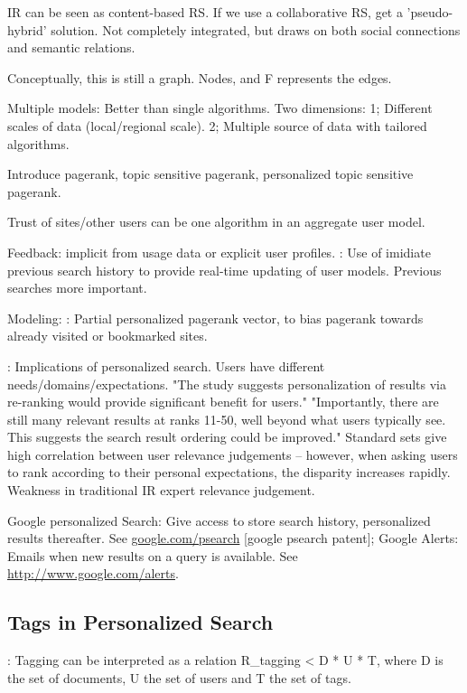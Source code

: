 IR can be seen as content-based RS. 
If we use a collaborative RS, get a 'pseudo-hybrid' solution. Not completely integrated,
but draws on both social connections and semantic relations.

Conceptually, this is still a graph.
Nodes, and F represents the edges.

Multiple models: Better than single algorithms. Two dimensions: 
1; Different scales of data (local/regional scale).
2; Multiple source of data with tailored algorithms.

Introduce pagerank, topic sensitive pagerank, personalized topic sensitive pagerank.

Trust of sites/other users can be one algorithm in an aggregate user model.

Feedback: 
\cite[p9]{Micarelli2007} implicit from usage data or explicit user profiles. 
\cite{Shen2005}: Use of imidiate previous search history to provide real-time updating of user models. Previous searches more important.

Modeling:
\cite{Jeh2003}: Partial personalized pagerank vector, to bias pagerank towards already visited or bookmarked sites.

\cite[p2]{Teevan2005a}: Implications of personalized search. Users have different needs/domains/expectations.
"The study suggests personalization of results via re-ranking would provide significant benefit for users."
"Importantly, there are still many relevant results at ranks 11-50, well beyond what users typically see. 
This suggests the search result ordering could be improved."
Standard sets give high correlation between user relevance judgements -- however, when asking users
to rank according to their personal expectations, the disparity increases rapidly. Weakness in 
traditional IR expert relevance judgement.

Google personalized Search: Give access to store search history, personalized results thereafter. See \url{google.com/psearch} [google psearch patent]; 
Google Alerts: Emails when new results on a query is available. See \url{http://www.google.com/alerts}.

\subsection{Tags in Personalized Search}

\cite[p4]{Noll2007}: 
Tagging can be interpreted as a relation R\_tagging < D * U * T, where D is the set of documents, U the set of users and T the set of tags.

